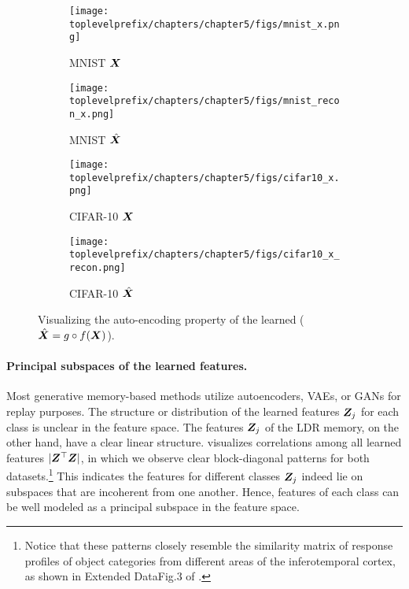 \documentclass[../../book-main.tex]{subfiles}
\begin{document}
\begin{figure}[t]
    \begin{subfigure}[t]{0.20\textwidth}
        \centering
        \texttt{[image: \\toplevelprefix/chapters/chapter5/figs/mnist\_x.png]}
        \caption{MNIST $\bm{X}$}
    \end{subfigure}
    \hfill
    \begin{subfigure}[t]{0.20\textwidth}
        \centering
        \texttt{[image: \\toplevelprefix/chapters/chapter5/figs/mnist\_recon\_x.png]}
        \caption{MNIST $\hat{\bm{X}}$}
    \end{subfigure}
    \hfill
    \begin{subfigure}[t]{0.20\textwidth}
        \centering
        \texttt{[image: \\toplevelprefix/chapters/chapter5/figs/cifar10\_x.png]}
        \caption{CIFAR-10 $\bm{X}$}
    \end{subfigure}
    \hfill
    \begin{subfigure}[t]{0.20\textwidth}
        \centering
        \texttt{[image: \\toplevelprefix/chapters/chapter5/figs/cifar10\_x\_recon.png]}
        \caption{CIFAR-10 $\hat{\bm{X}}$}
    \end{subfigure}
    \caption{\small Visualizing the auto-encoding property of the learned  ($\hat{\bm{X}} = g\circ f(\bm{X})$). }
        \label{fig:justify_xhat_equals_x_incremental}
\end{figure}


\paragraph{Principal subspaces of the learned features.}
Most generative memory-based methods utilize autoencoders, VAEs, or GANs for replay purposes. The structure or distribution of the learned features $\bm{Z}_j$ for each class is  unclear in the feature space. The features $\bm{Z}_j$ of the LDR memory, on the other hand, have a clear linear structure.  visualizes correlations among all learned features $|\bm{Z}^\top\bm{Z}|$, in which we observe clear block-diagonal patterns for both datasets.\footnote{Notice that these patterns closely resemble the similarity matrix of response profiles of object categories from different areas of the inferotemporal cortex, as shown in  Extended DataFig.3 of \cite{Bao2020AMO}.} This indicates the features for different classes $\bm{Z}_j$ indeed lie on subspaces that are incoherent from one another. Hence, features of each class can be well modeled as a principal subspace in the feature space. %
\end{document}

